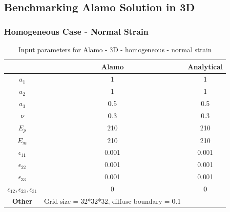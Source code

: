 \documentclass[12pt, a4paper]{report}
\begin{document}
\newpage
\subsection{Benchmarking Alamo Solution in 3D}

\subsubsection{Homogeneous Case - Normal Strain}
\begin{table}[H]
    \centering
    \begin{tabular}{|c|c|c|}
        \hline
        & \textbf{Alamo} &\textbf{Analytical}\\
        \hline
        \textbf{$a_1$} & 1 & 1 \\
        \hline
        \textbf{$a_2$} & 1 & 1 \\
        \hline
        \textbf{$a_3$} & 0.5 & 0.5 \\
        \hline
        \textbf{$\nu$} & 0.3 & 0.3 \\
        \hline
        \textbf{$E_p$} & 210 & 210 \\
        \hline
        \textbf{$E_m$} & 210 & 210 \\
        \hline
        \textbf{$\epsilon_{11}$} & 0.001 & 0.001 \\
        \hline
        \textbf{$\epsilon_{22}$} & 0.001 & 0.001 \\
        \hline
        \textbf{$\epsilon_{33}$} & 0.001 & 0.001 \\
        \hline
        \textbf{$\epsilon_{12}, \epsilon_{23}, \epsilon_{31}$} & 0 & 0 \\
        \hline
        \textbf{Other} & Grid size = 32*32*32, diffuse boundary = 0.1 &  \\
        \hline
    \end{tabular}
    \caption{Input parameters for Alamo - 3D - homogeneous - normal strain}
\end{table}
\end{document}
